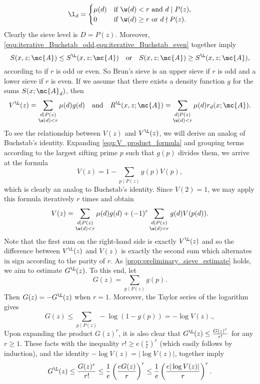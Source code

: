     \[
      \l_{d} = \begin{cases} \mu(d) & \text{if $\w(d) < r$ and $d \mid P(z)$}, \\ 0 & \text{if $\w(d) \ge r$ or $d \nmid P(z)$}. \end{cases}
    \]
    Clearly the sieve level is $D = P(z)$. Moreover, \cref{equ:iterative_Buchstab_odd,equ:iterative_Buchstab_even} together imply
    \[
      S(x,z;\mc{A}) \le S^{\L}(x,z;\mc{A}) \quad \text{or} \quad S(x,z;\mc{A}) \ge S^{\L}(x,z;\mc{A}),
    \]
    according to if $r$ is odd or even. So Brun's sieve is an upper sieve if $r$ is odd and a lower sieve if $r$ is even. If we assume that there exists a density function $g$ for the sums $S(x;\mc{A}_{d})$, then
    \[
      V^{\L}(z) = \sum_{\substack{d \mid P(z) \\ \w(d) < r}}\mu(d)g(d) \quad \text{and} \quad R^{\L}(x,z;\mc{A}) = \sum_{\substack{d \mid P(z) \\ \w(d) < r}}\mu(d)r_{d}(x;\mc{A}).
    \]
    To see the relationship between $V(z)$ and $V^{\L}(z)$, we will derive an analog of Buchstab's identity. Expanding \cref{equ:V_product_formula} and grouping terms according to the largest sifting prime $p$ such that $g(p)$ divides them, we arrive at the formula
    \[
      V(z) = 1-\sum_{p \mid P(z)}g(p)V(p),
    \]
    which is clearly an analog to Buchstab's identity. Since $V(2) = 1$, we may apply this formula iteratively $r$ times and obtain
    \[
      V(z) = \sum_{\substack{d \mid P(z) \\ \w(d) < r}}\mu(d)g(d)+(-1)^{r}\sum_{\substack{d \mid P(z) \\ \w(d) = r}}g(d)V(p(d)).
    \]
    Note that the first sum on the right-hand side is exactly $V^{\L}(z)$ and so the difference between $V^{\L}(z)$ and $V(z)$ is exactly the second sum which alternates in sign according to the parity of $r$. As \cref{prop:preliminary_sieve_estimate} holds, we aim to estimate $G^{\L}(z)$. To this end, let
    \[
      G(z) = \sum_{p \mid P(z)}g(p).
    \]
    Then $G(z) = -G^{\L}(z)$ when $r = 1$. Moreover, the Taylor series of the logarithm gives
    \[
      G(z) \le \sum_{p \mid P(z)}-\log(1-g(p)) = -\log V(z).,
    \]
    Upon expanding the product $G(z)^{r}$, it is also clear that $G^{\L}(z) \le \frac{G(z)^{r}}{r!}$ for any $r \ge 1$. These facts with the inequality $r! \ge e\left(\frac{r}{e}\right)^{r}$ (which easily follows by induction), and the identity $-\log V(z) = |\log V(z)|$, together imply
    \[
      G^{\L}(z) \le \frac{G(z)^{r}}{r!} \le \frac{1}{e}\left(\frac{eG(z)}{r}\right)^{r} \le \frac{1}{e}\left(\frac{e|\log V(z)|}{r}\right)^{r}.
    \]
